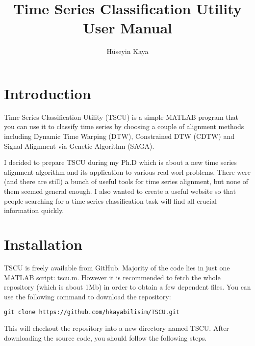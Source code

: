 \documentclass{article}
\title{Time Series Classification Utility\\
User Manual}
\author{H\"useyin Kaya}
\begin{document}
\maketitle
\tableofcontents

\section{Introduction}
Time Series Classification Utility (TSCU) is a simple MATLAB program that you can use it to classify time series by choosing a couple of alignment methods including Dynamic Time Warping (DTW), Constrained DTW (CDTW) and Signal Alignment via Genetic Algorithm (SAGA).

I decided to prepare TSCU during my Ph.D which is about a new time series alignment algorithm and its application to various real-worl problems. There were (and there are still) a bunch of useful tools for time series alignment, but none of them seemed general enough. I also wanted to create a useful website so that people searching for a time series classification task will find all crucial information quickly.
\section{Installation}
TSCU is freely available from GitHub. Majority of the code lies in just one MATLAB script: tscu.m. However it is recommended to fetch the whole repository (which is about 1Mb) in order to obtain a few dependent files. You can use the following command to download the repository:
\begin{verbatim}
git clone https://github.com/hkayabilisim/TSCU.git
\end{verbatim}
This will checkout the repository into a new directory named TSCU.
After downloading the source code, you should follow the following steps.
\end{document}
